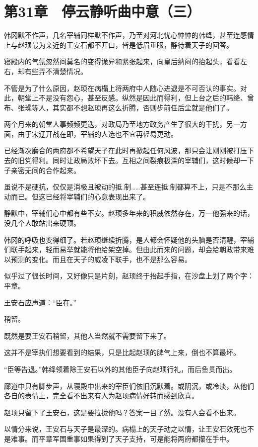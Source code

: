 \section{第31章　停云静听曲中意（三）}

韩冈默不作声，几名宰辅同样默不作声，乃至对河北忧心忡忡的韩绛，甚至连感情上与赵顼最为亲近的王安石都不开口，皆是低眉垂眼，静待着天子的回答。

寝殿内的气氛忽然间莫名的变得诡异和紧张起来，向皇后纳闷的抬起头，看看左右，却有些弄不清楚情况。

不管是为了什么原因，赵顼在病榻上将两府中人随心进退是不可否认的事实。对此，朝堂上不是没有怨心，甚至反感。纵然是因此而得利，但上台之后的韩绛、曾布、张璪等人，其实都不想赵顼再这么折腾，否则步前任后尘就是他们了。

两个月来的朝堂人事频频更迭，对政局乃至地方政务产生了很大的干扰，另一方面，由于宋辽开战在即，宰辅的人选也不宜再轻易更动。

已经渐次磨合的两府都不希望天子在此时再掀起任何风波，那只会让刚刚被打压下去的旧党得利。同时让政局败坏下去。互相之间裂痕极深的宰辅们，这时候却一下子亲密无间的合作起来。

虽说不是硬抗，仅仅是消极且被动的抵.制……甚至连抵.制都算不上，只是不那么主动而已。但这已经将宰辅们的心意表现出来了。

静默中，宰辅们心中都有些不安。赵顼多年来的积威依然存在，万一他强来的话，没几个人敢站出来硬顶。

韩冈的呼吸也变得细了。若赵顼继续折腾，是人都会怀疑他的头脑是否清醒，宰辅们联手起来，轻而易举就能将他给架空掉。但由此而来的问题，却会给朝政带来难以预测的变化。而且在天子的威凌下联手，也不是那么容易。

似乎过了很长时间，又好像只是片刻，赵顼终于抬起手指，在沙盘上划了两个字：平章。

王安石应声道：“臣在。”

稍留。

既然是要王安石稍留，其他人当然就不需要留下来了。

这并不是宰执们想要看到的结果，只是比起赵顼的脾气上来，倒也不算最坏。

“臣等告退。”韩绛领着除王安石以外的其他臣子向赵顼行礼，而后鱼贯而出。

廊道中只有脚步声，从寝殿中出来的宰臣们依旧沉默着。或阴沉，或冷淡，从他们各自的表情上，完全看不出来有人为赵顼病情好转而感到欣喜。

赵顼只留下了王安石，这是要拉拢他吗？答案一目了然。没有人会看不出来。

以情分来说，王安石与天子是最深的。病榻上的天子动之以情，让王安石效死也不是难事。而平章军国重事如果得到了天子支持，可是能将两府都攥在手中。

